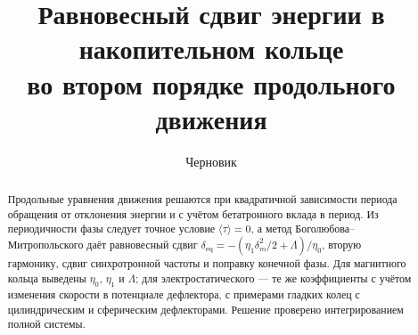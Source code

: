 \documentclass[aps,pra,preprint,a4paper,amsmath,amssymb,longbibliography]{revtex4-2}
\newcommand{\eq}{\mathrm{eq}}
\begin{document}
\title{Равновесный сдвиг энергии в накопительном кольце\\ во втором порядке продольного движения}
\author{Черновик}

\begin{abstract}
Продольные уравнения движения решаются при квадратичной зависимости периода обращения от отклонения энергии и с учётом бетатронного вклада в период. Из периодичности фазы следует точное условие $\langle\tau\rangle=0$, а метод Боголюбова--Митропольского даёт равновесный сдвиг $\delta_\eq=-(\eta_1\delta_m^2/2+\Lambda)/\eta_0$, вторую гармонику, сдвиг синхротронной частоты и поправку конечной фазы. Для магнитного кольца выведены $\eta_0$, $\eta_1$ и $\Lambda$; для электростатического --- те же коэффициенты с учётом изменения скорости в потенциале дефлектора, с примерами гладких колец с цилиндрическим и сферическим дефлекторами. Решение проверено интегрированием полной системы.
\end{abstract}

\maketitle







\appendix




\end{document}

